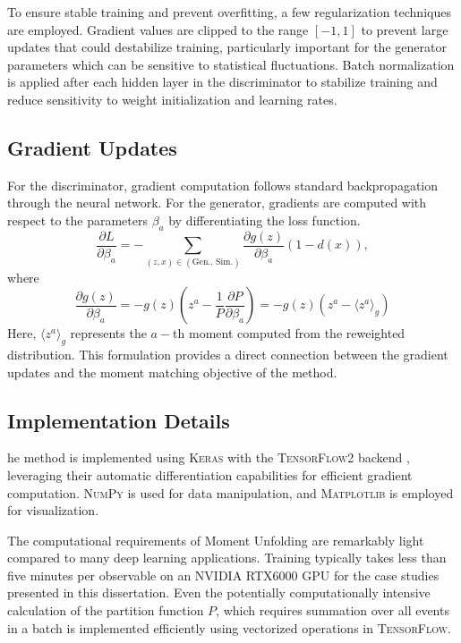         To ensure stable training and prevent overfitting, a few regularization techniques are employed.
        Gradient values are clipped to the range $[-1, 1]$ to prevent large updates that could destabilize training, particularly important for the generator parameters which can be sensitive to statistical fluctuations.
        Batch normalization  is applied after each hidden layer in the discriminator to stabilize training and reduce sensitivity to weight initialization and learning rates.
    \subsection{Gradient Updates}
        For the discriminator, gradient computation follows standard backpropagation through the neural network.
        For the generator, gradients are computed with respect to the parameters $\beta_a$ by differentiating the loss function.
        \[ 
            \frac{\partial L}{\partial \beta_a} = -\sum_{(z,x) \in (\text{Gen., Sim.})} \frac{\partial g(z)}{\partial \beta_a}(1-d(x)),
        \]
        where
        \[
            \frac{\partial g(z)}{\partial \beta_a} = -g(z)\left(z^a - \frac{1}{P}\frac{\partial P}{\partial \beta_a}\right) = -g(z)(z^a - \langle z^a \rangle_{g})
        \]
        Here, $\langle z^a \rangle_{g}$ represents the $a-$th moment computed from the reweighted distribution.
        This formulation provides a direct connection between the gradient updates and the moment matching objective of the method.
    \subsection{Implementation Details}
        he method is implemented using \textsc{Keras}  with the \textsc{TensorFlow2} backend , leveraging their automatic differentiation capabilities for efficient gradient computation.
        \textsc{NumPy}  is used for data manipulation, and \textsc{Matplotlib}  is employed for visualization.

        The computational requirements of Moment Unfolding are remarkably light compared to many deep learning applications.
        Training typically takes less than five minutes per observable on an NVIDIA RTX6000 GPU for the case studies presented in this dissertation.
       Even the potentially computationally intensive calculation of the partition function $P$, which requires summation over all events in a batch is implemented efficiently using vectorized operations in \textsc{TensorFlow}.

